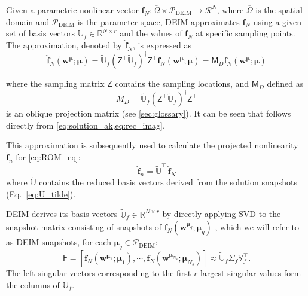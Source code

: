 \documentclass[11pt]{article}
\renewcommand{\vec}[1]{\mathbf{#1}}
\newcommand{\mat}[1]{\mathsf{#1}}
\begin{document}
Given a parametric nonlinear vector $\vec{f}_N: \overline{\Omega} \times \mathcal{P}_{\text{DEIM}} \to \mathcal{R}^N$, where \( \overline{\Omega} \) is the spatial domain and \( \mathcal{P}_{\text{DEIM}} \) is the parameter space, DEIM approximates \( \vec{f}_N \) using a given set of basis vectors \( \widetilde{\mathbb{U}}_f \in \mathbb{R}^{N \times r} \) and the values of $\vec{f}_N$ at specific sampling points.
The approximation, denoted by $\widehat{\vec{f}}_N$, is expressed as
\begin{equation}
    \widehat{\vec{f}}_N(\vec{w}^{\boldsymbol{\mu}}; \boldsymbol{\mu}) = \widetilde{\mathbb{U}}_f \left(\mat{Z}^\top \widetilde{\mathbb{U}}_f\right)^{\dagger} \mat{Z}^\top \vec{f}_N(\vec{w}^{\boldsymbol{\mu}}; \boldsymbol{\mu}) = \mat{M}_D \vec{f}_N(\vec{w}^{\boldsymbol{\mu}}; \boldsymbol{\mu})
    \label{eq:deim_approx}
\end{equation}

where the sampling matrix $\mat{Z}$ contains the sampling locations, and $\mat{M}_D$  defined as
\begin{equation}
 M_D = \widetilde{\mathbb{U}}_f \left(\mat{Z}^\top \widetilde{\mathbb{U}}_f\right)^{\dagger} \mat{Z}^\top
 \label{eq:deim_mat}
\end{equation}
is an oblique projection matrix (see \cref{sec:glossary}).
It can be seen that  follows directly from \cref{eq:solution_ak,eq:rec_imag}.


This approximation is subsequently used to calculate the projected nonlinearity $\widehat{\vec{f}}_n$ for \cref{eq:ROM_eq}:
\begin{equation}
    \widehat{\vec{f}}_n  = \widetilde{\mathbb{U}}^\top \, \widehat{\vec{f}}_N
    \label{eq:deim_approx_fn}
\end{equation}
where $\widetilde{\mathbb{U}}$ contains the reduced basis vectors derived from the solution snapshots (Eq.~\ref{eq:U_tilde}).


DEIM derives its basis vectors \( \widetilde{\mathbb{U}}_f \in \mathbb{R}^{N \times r} \) by directly applying SVD to the snapshot matrix consisting of snapshots of \( \vec{f}_N(\vec{w}^{\boldsymbol{\mu}_q}; \boldsymbol{\mu}_q) \) , which we will refer to as DEIM-snapshots, for each \( \boldsymbol{\mu}_q \in \mathcal{P}_{\text{DEIM}} \):
\begin{equation}
\mat{F} = \left[ \vec{f}_N(\vec{w}^{\boldsymbol{\mu}_1}; \boldsymbol{\mu}_1), \cdots, \vec{f}_N(\vec{w}^{\boldsymbol{\mu}_{N_s}}; \boldsymbol{\mu}_{N_s}) \right] \approx \widetilde{\mathbb{U}}_f \mat{\Sigma}_f \mathbb{V}_f^\top.
\end{equation}
The left singular vectors corresponding to the first $r$ largest singular values form the columns of \( \widetilde{\mathbb{U}}_f \).
\end{document}
